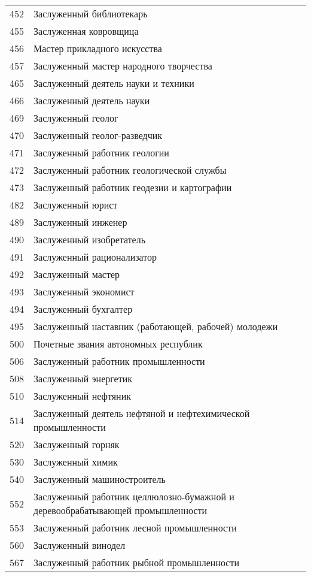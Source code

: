\documentclass[10pt, a4paper, titlepage]{article}
\begin{document}
\begin{xtabular}{rp{.38\textwidth}}
    452 & Заслуженный библиотекарь \\
    455 & Заслуженная ковровщица \\
    456 & Мастер прикладного искусства \\
    457 & Заслуженный мастер народного творчества \\
    465 & Заслуженный деятель науки и техники \\
    466 & Заслуженный деятель науки \\
    469 & Заслуженный геолог \\
    470 & Заслуженный геолог-разведчик \\
    471 & Заслуженный работник геологии \\
    472 & Заслуженный работник геологической службы \\
    473 & Заслуженный работник геодезии и картографии \\
    482 & Заслуженный юрист \\
    489 & Заслуженный инженер \\
    490 & Заслуженный изобретатель \\
    491 & Заслуженный рационализатор \\
    492 & Заслуженный мастер \\
    493 & Заслуженный экономист \\
    494 & Заслуженный бухгалтер \\
    495 & Заслуженный наставник (работающей, рабочей) молодежи \\
    500 & Почетные звания автономных республик \\
    506 & Заслуженный работник промышленности \\
    508 & Заслуженный энергетик \\
    510 & Заслуженный нефтяник \\
    514 & Заслуженный деятель нефтяной и нефтехимической промышленности \\
    520 & Заслуженный горняк \\
    530 & Заслуженный химик \\
    540 & Заслуженный машиностроитель \\
    552 & Заслуженный работник целлюлозно-бумажной и деревообрабатывающей промышленности \\
    553 & Заслуженный работник лесной промышленности \\
    560 & Заслуженный винодел \\
    567 & Заслуженный работник рыбной промышленности \\

\end{xtabular}
\end{document}
